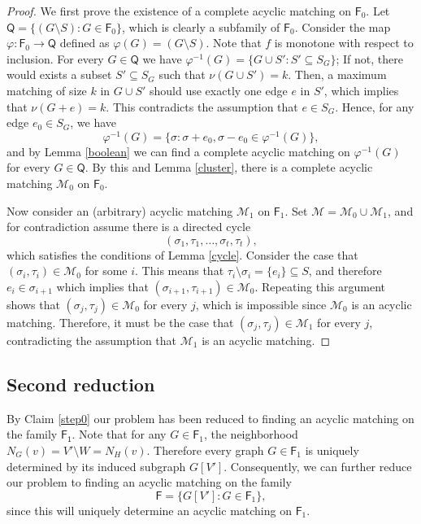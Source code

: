 \documentclass[10pt]{amsart}
\newcommand{\MM}{\mathcal{M}}
\theoremstyle{definition}
\begin{document}
	\begin{proof}
		We first prove the existence of a complete acyclic matching on $\mathsf{F}_0$. Let $\mathsf{Q} = \{ (G\setminus S): G \in \mathsf{F}_0\}$, which is clearly a subfamily of $\mathsf{F}_0$. 
		Consider the map $\varphi: \mathsf{F}_0 \to \mathsf{Q}$ defined as $\varphi(G)=(G\setminus S)$. Note that $f$ is monotone with respect to inclusion. For every $G\in \mathsf{Q}$ we have $\varphi^{-1}(G) = \{G\cup S' : S'\subseteq S_G\}$; If not, there would exists a subset $S'\subseteq S_G$ such that $\nu(G\cup S')= k$. Then, a maximum matching of size $k$ in $G\cup S'$ should use exactly one edge $e$ in $S'$, which implies that $\nu(G+e)=k$. This contradicts the assumption that $e \in S_G$. 
		Hence, for any edge $e_0 \in S_G$, we have
		$$\varphi^{-1}(G)=\{\sigma: \sigma+e_0, \sigma-e_0  \in\varphi^{-1}(G)\},$$	
		and by Lemma \ref{boolean}
		we can find a complete acyclic matching on $\varphi^{-1}(G)$ for every $G\in \mathsf{Q}$. By this and  Lemma \ref{cluster}, there is a complete acyclic matching $\MM_0$ on $\mathsf{F}_0$.
		
		Now consider an (arbitrary) acyclic matching  $\MM_1$ on $\mathsf{F}_1$. 
		Set $\MM=\MM_0\cup \MM_1$, and for contradiction assume there is a directed cycle
		\[(\sigma_1, \tau_1, \dots, \sigma_t,\tau_t),\] which satisfies the conditions of Lemma \ref{cycle}. Consider the case that $(\sigma_i,\tau_i)\in \MM_0$ for some $i$. This means that $\tau_i\setminus \sigma_i=\{e_i \} \subseteq S$, and therefore $e_i \in \sigma_{i+1}$ which implies that $(\sigma_{i+1}, \tau_{i+1}) \in \MM_0$. Repeating this argument shows that $(\sigma_j, \tau_j) \in \MM_0$ for every $j$, which is impossible since $\MM_0$ is an acyclic matching. Therefore, it must be the case that  $(\sigma_j, \tau_j) \in \MM_1$ for every $j$, contradicting the assumption that $\MM_1$ is an acyclic matching.
	\end{proof}
	
	
	\subsection*{Second reduction}
	By Claim \ref{step0} our problem has been reduced to finding an acyclic matching on the family $\mathsf{F_1}$. Note that for any $G\in \mathsf{F}_1$, the neighborhood $N_G(v) = V'\setminus W = N_H(v)$. Therefore every graph $G\in \mathsf{F}_1$ is uniquely determined by its induced subgraph $G[V']$.  
	Consequently, we can further reduce our problem to finding an acyclic matching on the family \[\mathsf{F}=\{G[V']  : G\in \mathsf{F}_1\},\] since this will uniquely determine an acyclic matching on $\mathsf{F}_1$. 
	
\end{document}
